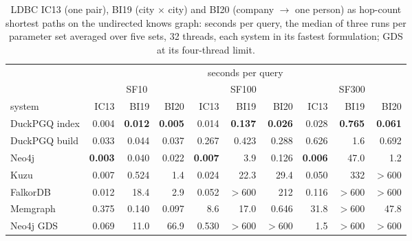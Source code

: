 \begin{table}[t]\centering\scriptsize\setlength{\tabcolsep}{1.4pt}
\caption{LDBC IC13 (one pair), BI19 (city $\times$ city) and BI20 (company $\to$ one person) as hop-count shortest paths on the undirected knows graph: seconds per query, the median of three runs per parameter set averaged over five sets, 32 threads, each system in its fastest formulation; GDS at its four-thread limit.}\label{tab:ldbc}
\begin{tabular}{lrrrrrrrrr}\toprule
 & \multicolumn{9}{c}{seconds per query} \\
 & \multicolumn{3}{c}{SF10} & \multicolumn{3}{c}{SF100} & \multicolumn{3}{c}{SF300} \\
system & IC13 & BI19 & BI20 & IC13 & BI19 & BI20 & IC13 & BI19 & BI20 \\ \midrule
DuckPGQ index & 0.004 & \textbf{0.012} & \textbf{0.005} & 0.014 & \textbf{0.137} & \textbf{0.026} & 0.028 & \textbf{0.765} & \textbf{0.061} \\
DuckPGQ build & 0.033 & 0.044 & 0.037 & 0.267 & 0.423 & 0.288 & 0.626 & 1.6 & 0.692 \\
Neo4j & \textbf{0.003} & 0.040 & 0.022 & \textbf{0.007} & 3.9 & 0.126 & \textbf{0.006} & 47.0 & 1.2 \\
Kuzu & 0.007 & 0.524 & 1.4 & 0.024 & 22.3 & 29.4 & 0.050 & 332 & $>$600 \\
FalkorDB & 0.012 & 18.4 & 2.9 & 0.052 & $>$600 & 212 & 0.116 & $>$600 & $>$600 \\
Memgraph & 0.375 & 0.140 & 0.097 & 8.6 & 17.0 & 0.646 & 31.8 & $>$600 & 47.8 \\
Neo4j GDS & 0.069 & 11.0 & 66.9 & 0.530 & $>$600 & $>$600 & 1.5 & $>$600 & $>$600 \\
\bottomrule\end{tabular}\end{table}
